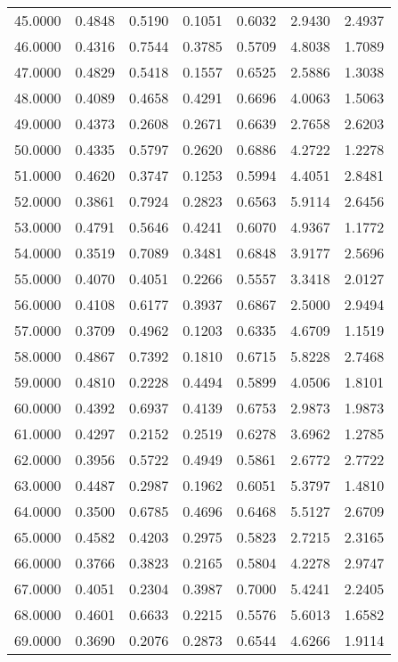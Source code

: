 \begin{longtable}{ p{}  p{}  p{}  p{}  p{} p{}  p{} }
45.0000	&	0.4848	&	0.5190	&	0.1051	&	0.6032	&	2.9430	&	2.4937	\\
46.0000	&	0.4316	&	0.7544	&	0.3785	&	0.5709	&	4.8038	&	1.7089	\\
47.0000	&	0.4829	&	0.5418	&	0.1557	&	0.6525	&	2.5886	&	1.3038	\\
48.0000	&	0.4089	&	0.4658	&	0.4291	&	0.6696	&	4.0063	&	1.5063	\\
49.0000	&	0.4373	&	0.2608	&	0.2671	&	0.6639	&	2.7658	&	2.6203	\\
50.0000	&	0.4335	&	0.5797	&	0.2620	&	0.6886	&	4.2722	&	1.2278	\\
51.0000	&	0.4620	&	0.3747	&	0.1253	&	0.5994	&	4.4051	&	2.8481	\\
52.0000	&	0.3861	&	0.7924	&	0.2823	&	0.6563	&	5.9114	&	2.6456	\\
53.0000	&	0.4791	&	0.5646	&	0.4241	&	0.6070	&	4.9367	&	1.1772	\\
54.0000	&	0.3519	&	0.7089	&	0.3481	&	0.6848	&	3.9177	&	2.5696	\\
55.0000	&	0.4070	&	0.4051	&	0.2266	&	0.5557	&	3.3418	&	2.0127	\\
56.0000	&	0.4108	&	0.6177	&	0.3937	&	0.6867	&	2.5000	&	2.9494	\\
57.0000	&	0.3709	&	0.4962	&	0.1203	&	0.6335	&	4.6709	&	1.1519	\\
58.0000	&	0.4867	&	0.7392	&	0.1810	&	0.6715	&	5.8228	&	2.7468	\\
59.0000	&	0.4810	&	0.2228	&	0.4494	&	0.5899	&	4.0506	&	1.8101	\\
60.0000	&	0.4392	&	0.6937	&	0.4139	&	0.6753	&	2.9873	&	1.9873	\\
61.0000	&	0.4297	&	0.2152	&	0.2519	&	0.6278	&	3.6962	&	1.2785	\\
62.0000	&	0.3956	&	0.5722	&	0.4949	&	0.5861	&	2.6772	&	2.7722	\\
63.0000	&	0.4487	&	0.2987	&	0.1962	&	0.6051	&	5.3797	&	1.4810	\\
64.0000	&	0.3500	&	0.6785	&	0.4696	&	0.6468	&	5.5127	&	2.6709	\\
65.0000	&	0.4582	&	0.4203	&	0.2975	&	0.5823	&	2.7215	&	2.3165	\\
66.0000	&	0.3766	&	0.3823	&	0.2165	&	0.5804	&	4.2278	&	2.9747	\\
67.0000	&	0.4051	&	0.2304	&	0.3987	&	0.7000	&	5.4241	&	2.2405	\\
68.0000	&	0.4601	&	0.6633	&	0.2215	&	0.5576	&	5.6013	&	1.6582	\\
69.0000	&	0.3690	&	0.2076	&	0.2873	&	0.6544	&	4.6266	&	1.9114	\\

\end{longtable}
